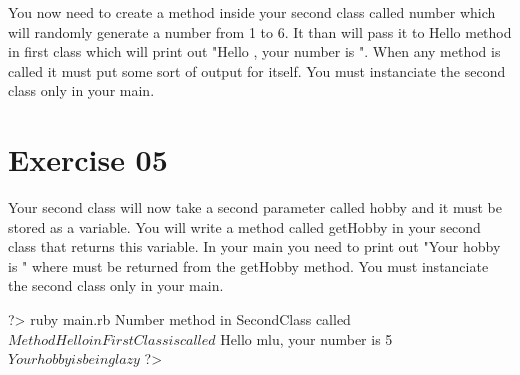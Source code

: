 \documentclass{42-en}
\begin{document}
\makeheaderfiles

You now need to create a method inside your second class called number which will randomly generate a number from 1 to 6. It than will pass it to Hello method in first class which will print out "Hello , your number is ". When any method is called it must put some sort of output for itself. You must instanciate the second class only in your main.



\chapter{Exercise 05}


\makeheaderfiles

Your second class will now take a second parameter called hobby and it must be stored as a variable. You will write a method called getHobby in your second class that returns this variable. In your main you need to print out "Your hobby is " where must be returned from the getHobby method. You must instanciate the second class only in your main.

\begin{42console}
	?> ruby main.rb
	Number method in SecondClass called$
	Method Hello in FirstClass is called$
	Hello mlu, your number is 5$
	Your hobby is being lazy$
	?>
\end{42console}

\end{document}

